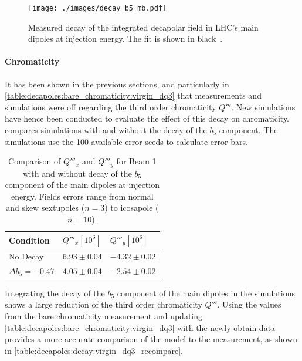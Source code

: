 \begin{figure}[!htb]
    \centering
    \texttt{[image: ./images/decay\_b5\_mb.pdf]}
    \caption{Measured decay of the integrated decapolar field in LHC's main dipoles at injection
    energy. The fit is shown in black~\cite{deniau_magnetic_2009}.}
    \label{fig:decapoles:decay:decay_b5}
\end{figure}



\paragraph{Chromaticity}
It has been shown in the previous sections, and particularly in
\cref{table:decapoles:bare_chromaticity:virgin_dq3} that measurements and simulations were off
regarding the third order chromaticity $Q'''$.
New simulations have hence been conducted to evaluate the effect of this decay on chromaticity.
 compares simulations with and
without the decay of the $b_5$ component. The simulations use the 100 available error seeds to
calculate error bars.

\begin{table}[!htb]
    \centering
    \begin{tabular}{lll}
      \toprule
      Condition            & $Q'''_x [10^6]$ & $Q'''_y [10^6]$ \\
      \midrule
      No Decay             & $6.93 \pm 0.04$ & $-4.32 \pm 0.02$ \\
      $\Delta b_5 = -0.47$ & $4.05 \pm 0.04$ & $-2.54 \pm 0.02 $ \\
      \bottomrule
    \end{tabular}
    \caption{Comparison of $Q'''_x$ and $Q'''_y$ for Beam 1 with and without decay of the $b_5$
    component of the main dipoles at injection energy. Fields errors range from normal and skew
    sextupoles ($n=3$) to icosapole ($n=10$).}
    \label{table:decapoles:decay:simulation_chromaticity}
  \end{table}

Integrating the decay of the $b_5$ component of the main dipoles in the simulations shows a large
reduction of the third order chromaticity $Q'''$.
Using the values from the bare chromaticity measurement and updating
\cref{table:decapoles:bare_chromaticity:virgin_dq3} with the newly obtain data provides a more
accurate comparison of the model to the measurement, as shown in
\cref{table:decapoles:decay:virgin_dq3_recompare}.


